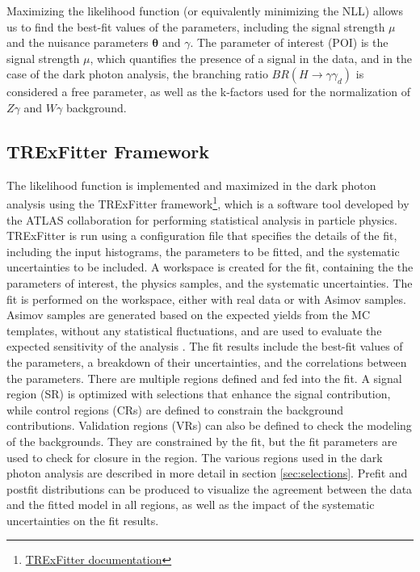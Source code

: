 Maximizing the likelihood function (or equivalently minimizing the NLL) allows us to find the best-fit values of the parameters, including the signal strength $\mu$ and the nuisance parameters $\boldsymbol{\theta}$ and $\gamma$.
The parameter of interest (POI) is the signal strength $\mu$, which quantifies the presence of a signal in the data, and in the case of the dark photon analysis, the branching ratio $BR(H\rightarrow \gamma \gamma_d)$ is considered a free parameter, as well as the k-factors used for the normalization of $Z\gamma$ and $W\gamma$ background.

\subsection{TRExFitter Framework}

The likelihood function is implemented and maximized in the dark photon analysis using the TRExFitter framework\footnote{\href{https://trexfitter-docs.web.cern.ch/trexfitter-docs/latest/}{TRExFitter documentation}}, which is a software tool developed by the ATLAS collaboration for performing statistical analysis in particle physics.
TRExFitter is run using a configuration file that specifies the details of the fit, including the input histograms, the parameters to be fitted, and the systematic uncertainties to be included.
A workspace is created for the fit, containing the the parameters of interest, the physics samples, and the systematic uncertainties.
The fit is performed on the workspace, either with real data or with Asimov samples.
Asimov samples are generated based on the expected yields from the MC templates, without any statistical fluctuations, and are used to evaluate the expected sensitivity of the analysis \cite{Cowan_2011}.
The fit results include the best-fit values of the parameters, a breakdown of their uncertainties, and the correlations between the parameters.
There are multiple regions defined and fed into the fit.
A signal region (SR) is optimized with selections that enhance the signal contribution, while control regions (CRs) are defined to constrain the background contributions.
Validation regions (VRs) can also be defined to check the modeling of the backgrounds.
They are constrained by the fit, but the fit parameters are used to check for closure in the region.
The various regions used in the dark photon analysis are described in more detail in section \ref{sec:selections}.
Prefit and postfit distributions can be produced to visualize the agreement between the data and the fitted model in all regions, as well as the impact of the systematic uncertainties on the fit results.
